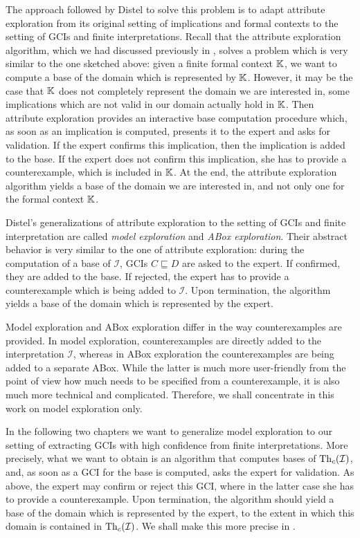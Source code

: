 The approach followed by Distel to solve this problem is to adapt attribute exploration
from its original setting of implications and formal contexts to the setting of GCIs and
finite interpretations.  Recall that the attribute exploration algorithm, which we had
discussed previously in , solves a problem which is very similar to
the one sketched above: given a finite formal context ${\mathbb{K}}$, we want to compute a base
of the domain which is represented by ${\mathbb{K}}$.  However, it may be the case that ${\mathbb{K}}$
does not completely represent the domain we are interested in, \ie some implications which
are not valid in our domain actually hold in ${\mathbb{K}}$.  Then attribute exploration
provides an interactive base computation procedure which, as soon as an implication is
computed, presents it to the expert and asks for validation.  If the expert confirms this
implication, then the implication is added to the base.  If the expert does not confirm
this implication, she has to provide a counterexample, which is included in ${\mathbb{K}}$.  At
the end, the attribute exploration algorithm yields a base of the domain we are interested
in, and not only one for the formal context ${\mathbb{K}}$.

Distel's generalizations of attribute exploration to the setting of GCIs and finite
interpretation are called \emph{model exploration} and \emph{ABox exploration}.  Their
abstract behavior is very similar to the one of attribute exploration: during the
computation of a base of $\mathcal{I}$, GCIs $C \sqsubseteq D$ are asked to the expert.
If confirmed, they are added to the base.  If rejected, the expert has to provide a
counterexample which is being added to $\mathcal{I}$.  Upon termination, the algorithm
yields a base of the domain which is represented by the expert.

Model exploration and ABox exploration differ in the way counterexamples are provided.  In
model exploration, counterexamples are directly added to the interpretation $\mathcal{I}$,
whereas in ABox exploration the counterexamples are being added to a separate ABox.  While
the latter is much more user-friendly from the point of view how much needs to be
specified from a counterexample, it is also much more technical and complicated.
Therefore, we shall concentrate in this work on model exploration only.

In the following two chapters we want to generalize model exploration to our setting of
extracting GCIs with high confidence from finite interpretations.  More precisely, what we
want to obtain is an algorithm that computes bases of $\operatorname{Th}_c(\mathcal{I})$, and, as soon
as a GCI for the base is computed, asks the expert for validation.  As above, the expert
may confirm or reject this GCI, where in the latter case she has to provide a
counterexample.  Upon termination, the algorithm should yield a base of the domain which
is represented by the expert, to the extent in which this domain is contained in
$\operatorname{Th}_c(\mathcal{I})$.  We shall make this more precise in .

